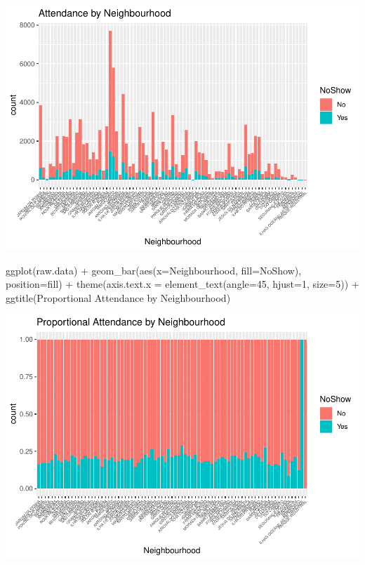 \documentclass[
]{article}
\newenvironment{Shaded}{\begin{snugshade}}{\end{snugshade}}
\newcommand{\AttributeTok}[1]{\textcolor[rgb]{0.77,0.63,0.00}{#1}}
\newcommand{\DecValTok}[1]{\textcolor[rgb]{0.00,0.00,0.81}{#1}}
\newcommand{\FunctionTok}[1]{\textcolor[rgb]{0.00,0.00,0.00}{#1}}
\newcommand{\NormalTok}[1]{#1}
\newcommand{\SpecialCharTok}[1]{\textcolor[rgb]{0.00,0.00,0.00}{#1}}
\newcommand{\StringTok}[1]{\textcolor[rgb]{0.31,0.60,0.02}{#1}}
\begin{document}
\begin{center}\includegraphics{lab1_medical_databases_files/figure-latex/unnamed-chunk-11-1} \end{center}

\begin{Shaded}
\begin{Highlighting}[]
\FunctionTok{ggplot}\NormalTok{(raw.data) }\SpecialCharTok{+} 
  \FunctionTok{geom\_bar}\NormalTok{(}\FunctionTok{aes}\NormalTok{(}\AttributeTok{x=}\NormalTok{Neighbourhood, }\AttributeTok{fill=}\NormalTok{NoShow), }\AttributeTok{position=}\StringTok{\textquotesingle{}fill\textquotesingle{}}\NormalTok{) }\SpecialCharTok{+} 
  \FunctionTok{theme}\NormalTok{(}\AttributeTok{axis.text.x =} \FunctionTok{element\_text}\NormalTok{(}\AttributeTok{angle=}\DecValTok{45}\NormalTok{, }\AttributeTok{hjust=}\DecValTok{1}\NormalTok{, }\AttributeTok{size=}\DecValTok{5}\NormalTok{)) }\SpecialCharTok{+} 
  \FunctionTok{ggtitle}\NormalTok{(}\StringTok{\textquotesingle{}Proportional Attendance by Neighbourhood\textquotesingle{}}\NormalTok{)}
\end{Highlighting}
\end{Shaded}

\begin{center}\includegraphics{lab1_medical_databases_files/figure-latex/unnamed-chunk-11-2} \end{center}
\end{document}
